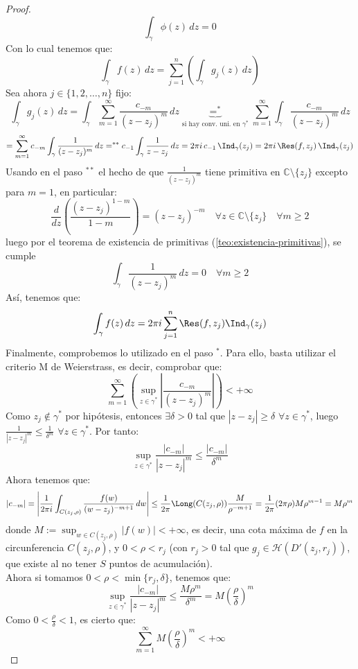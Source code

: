 \begin{proof}
    \[
        \int_{\gamma} \phi(z) \, dz = 0      
    \]
    Con lo cual tenemos que:
    \[
        \int_{\gamma} f(z) \, dz =
        \sum_{j=1}^{n} \left( \int_{\gamma} g_j(z) \, dz \right)
    \]
    Sea ahora $j \in \{1, 2, \ldots, n\}$ fijo:
    \[
        \int_{\gamma} g_j(z) \, dz =
        \int_{\gamma} \sum_{m=1}^{\infty} \frac{c_{-m}}{(z-z_j)^m} \, dz \underbrace{=^*}_{\text{si hay conv. uni. en } \gamma^*}
        \sum_{m=1}^{\infty} \int_\gamma \frac{c_{-m}}{(z-z_j)^m} \, dz 
    \]
    \[
        = \sum_{m=1}^{\infty} c_{-m} \int_\gamma \frac{1}{(z-z_j)^m} \, dz =^{**}
        c_{-1} \int_\gamma \frac{1}{z-z_j} \, dz =
        2 \pi i \, c_{-1} \, \Ind_\gamma (z_j) =
        2 \pi i \, \Res(f, z_j) \, \Ind_\gamma (z_j)
    \]
    Usando en el paso $^{**}$ el hecho de que $\frac{1}{(z-z_j)^m}$ tiene primitiva en $\mathbb{C} \setminus \{z_j\}$ excepto para $m=1$, en particular:
    \[
        \frac{d}{dz} \left(\frac{(z-z_j)^{1-m}}{1-m} \right) = (z-z_j)^{-m} \quad \forall z \in \mathbb{C} \setminus \{z_j\} \quad \forall m \geq 2
    \]    
    luego por el teorema de existencia de primitivas (\cref{teo:existencia-primitivas}), se cumple
    \[
        \int_\gamma \frac{1}{(z-z_j)^m} \, dz = 0 \quad \forall m \geq 2
    \]
    Así, tenemos que:
    \[
        \int_{\gamma} f(z) \, dz = 2 \pi i \sum_{j=1}^{n} \Res(f, z_j) \Ind_\gamma (z_j)
    \]
    Finalmente, comprobemos lo utilizado en el paso $^{*}$. Para ello, basta utilizar el criterio M de Weierstrass, es decir, comprobar que:
    \[
        \sum_{m=1}^{\infty} \left( \sup_{z \in \gamma^*} \left| \frac{c_{-m}}{(z-z_j)^m} \right| \right) < +\infty
    \]
    Como $z_j \notin \gamma^*$ por hipótesis, entonces $\exists \delta > 0$ tal que $|z-z_j| \geq \delta$ $\forall z \in \gamma^*$, luego $\frac{1}{|z-z_j|^m} \leq \frac{1}{\delta^m}$ $\forall z \in \gamma^*$. Por tanto:
    \[
    \sup_{z \in \gamma^*} \frac{ \left| c_{-m} \right| }{ \left| z-z_j \right|^m } \leq
    \frac{ \left| c_{-m} \right| }{ \delta^m }
    \]
    Ahora tenemos que:
    \[
    |c_{-m}| =
    \left| \frac{1}{2 \pi i} \int_{C(z_j, \rho)} \frac{f(w)}{(w-z_j)^{-m+1}} \, dw \right| \leq \frac{1}{2 \pi} \Long(C(z_j, \rho)) \frac{M}{\rho^{-m+1}} = \frac{1}{2 \pi} (2 \pi \rho) M \rho^{m-1} = M \rho^{m}
    \]
    donde $M := \sup_{w \in C(z_j, \rho)} |f(w)| < +\infty$, es decir, una cota máxima de $f$ en la circunferencia $C(z_j, \rho)$, y $0 < \rho < r_j$ (con $r_j > 0$ tal que $g_j \in \mathcal{H}(D'(z_j, r_j))$, que existe al no tener $S$ puntos de acumulación).\\
    Ahora si tomamos $0 < \rho < \min \{ r_j, \delta \}$, tenemos que:
    \[
    \sup_{z \in \gamma^*} \frac{ |c_{-m}| }{ |z-z_j|^m } \leq
    \frac{ M \rho^{m} }{ \delta^m } =
    M \left( \frac{\rho}{\delta} \right)^m
    \]
    Como $ 0 < \frac{\rho}{\delta} < 1$, es cierto que:
    \[
    \sum_{m=1}^{\infty} M \left( \frac{\rho}{\delta} \right)^m < +\infty
    \]
\end{proof}

